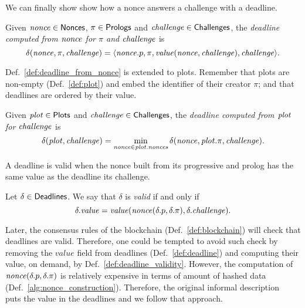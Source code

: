 %
We can finally show show how a nonce answers a challenge with a deadline.
%
\begin{definition}[$\delta(\nonce,\pi,\challenge)$]\label{def:deadline_from_nonce}
  Given ${\mathit{nonce}}\in{\mathsf{Nonces}}$, $\pi\in{\mathsf{Prologs}}$ and ${\mathit{challenge}}\in{\mathsf{Challenges}}$, the
  \emph{deadline computed from ${\mathit{nonce}}$ for $\pi$ and ${\mathit{challenge}}$} is
  \[
  \delta({\mathit{nonce}},\pi,{\mathit{challenge}})=\langle{\mathit{nonce}}.p,\pi,\mathit{value}({\mathit{nonce}},{\mathit{challenge}}),{\mathit{challenge}}\rangle.
  \]
\end{definition}
%
Def.~\ref{def:deadline_from_nonce} is extended to plots. Remember that plots are non-empty
(Def.~\ref{def:plot}) and embed the identifier of their creator $\pi$;
and that deadlines are ordered by their value.
%
\begin{definition}[$\deadline(\plot,\challenge)$]\label{def:deadline_from_plot}
  Given ${\mathit{plot}}\in{\mathsf{Plots}}$ and ${\mathit{challenge}}\in{\mathsf{Challenges}}$, the \emph{deadline computed
  from ${\mathit{plot}}$ for ${\mathit{challenge}}$} is
  \[
  \delta({\mathit{plot}},{\mathit{challenge}})=\min\limits_{{\mathit{nonce}}\in{\mathit{plot}}.{\mathit{nonces}}}\delta({\mathit{nonce}},{\mathit{plot}}.\pi,{\mathit{challenge}}).
  \]
\end{definition}
%
A deadline is valid when the nonce built from its progressive and prolog
has the same value as the deadline \wrt its challenge.
%
\begin{definition}\label{def:deadline_validity}
  Let $\delta\in{\mathsf{Deadlines}}$. We say that $\delta$ is \emph{valid} if and only if
  \[
  \delta.\mathit{value}=\mathit{value}({\mathit{nonce}}(\delta.p,\delta.\pi),\delta.{\mathit{challenge}}).
  \]
\end{definition}
%
Later, the consensus rules of the blockchain (Def.~\ref{def:blockchain})
will check that deadlines are valid. Therefore, one could be tempted to
avoid such check by removing the $\mathit{value}$ field from deadlines
(Def.~\ref{def:deadline}) and computing
their value, on demand, by Def.~\ref{def:deadline_validity}. However, the
computation of
${\mathit{nonce}}(\delta.p,\delta.\pi)$ is relatively expensive in terms of amount of hashed data
(Def.~\ref{alg:nonce_construction}).
Therefore, the original informal description~\cite{SignumPlotting} puts the value in the deadlines
and we follow that approach.
